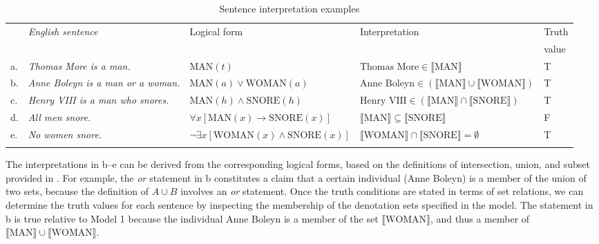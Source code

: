 \begin{sidewaystable}
\small
\caption{Sentence interpretation examples\label{extab:13.21}} 
\begin{tabular}{l@{~} >{\itshape}l l l l}
\lsptoprule
 & \textup{English sentence} &  Logical form &  Interpretation &  Truth\\
 &                           &               &                 &  value\\\midrule
a. &  Thomas More is a man. &  $\text{MAN}(t)$ & $\text{Thomas More} \in \llbracket\text{MAN}\rrbracket$  &   T \\
\tablevspace
b. &  Anne Boleyn is a man or a woman. &  $\text{MAN}(a) \vee \text{WOMAN}(a)$  &  $\text{Anne Boleyn} \in (\llbracket\text{MAN}\rrbracket \cup \llbracket\text{WOMAN}\rrbracket )$ & T\\
\tablevspace
c. &   {Henry VIII is a man who snores}. & $\text{MAN}(h) \wedge \text{SNORE}(h)$ & $\text{Henry VIII} \in (\llbracket\text{MAN}\rrbracket \cap \llbracket\text{SNORE}\rrbracket)$ & T\\
\tablevspace
d. & {All men snore}.& $\forall x[\text{MAN}(x) \rightarrow \text{SNORE}(x)]$ & $\llbracket\text{MAN}\rrbracket \subseteq \llbracket\text{SNORE}\rrbracket$  & F\\
\tablevspace
e. &   {No women snore.} &  $\neg \exists x[\text{WOMAN}(x) \wedge \text{SNORE}(x)]$ & $\llbracket\text{WOMAN}\rrbracket \cap \llbracket\text{SNORE}\rrbracket  = ∅$ & T\\
\lspbottomrule
\end{tabular} 
\end{sidewaystable}

The interpretations in b--e can be derived from the corresponding logical forms, based on the definitions of intersection, union, and subset provided in . For example, the \textit{or} statement in b constitutes a claim that a certain individual (Anne Boleyn) is a member of the union of two sets, because the definition of $A\cup B$ involves an \textit{or} statement. Once the truth conditions are stated in terms of set relations, we can determine the truth values for each sentence by inspecting the membership of the denotation sets specified in the model. The statement in b is true relative to Model 1 because the individual Anne Boleyn is a member of the set $\llbracket\text{WOMAN}\rrbracket$, and thus a member of $\llbracket\text{MAN}\rrbracket \cup \llbracket\text{WOMAN}\rrbracket$.


